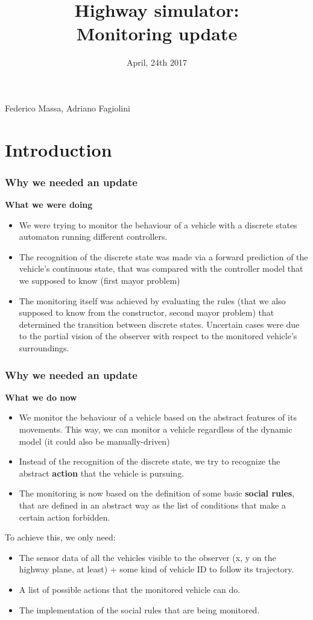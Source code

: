 \documentclass{beamer}
\title{Highway simulator: \\
Monitoring update}
\date{\small April, 24th 2017}
\begin{document}

{
\begin{frame}
\titlepage
\bigskip
\medskip
\centering\small Federico Massa, Adriano Fagiolini
\end{frame}}
\addtocounter{framenumber}{-1}

\section{Introduction}
\begin{frame}
\frametitle{Why we needed an update}
\textbf{What we were doing}
\begin{itemize}
	\item We were trying to monitor the behaviour of a vehicle
		  with a discrete states automaton running different
		  controllers.
 	\item The recognition of the discrete state was made via 
 		  a forward prediction of the vehicle's continuous state,
 		  that was compared with the controller model that we
 		  supposed to know (first mayor problem)
  	\item The monitoring itself was achieved by evaluating the
  		  rules (that we also supposed to know from the constructor, second 
  		  mayor problem) that determined the transition between
  		  discrete states. Uncertain cases were due to the 
  		  partial vision of the observer with respect to the 
  		  monitored vehicle's surroundings.
\end{itemize}
\end{frame}

\begin{frame}
\frametitle{Why we needed an update}
\textbf{What we do now}
\begin{itemize}
	\item We monitor the behaviour of a vehicle based on the
		  abstract features of its movements. This way, we can
		  monitor a vehicle regardless of the dynamic model 
		  (it could also be manually-driven)
 	\item Instead of the recognition of the discrete state,
 		  we try to recognize the abstract \textbf{action} 
 		  that the vehicle is pursuing. 
  	\item The monitoring is now based on the definition
  		  of some basic \textbf{social rules}, that 
  		  are defined in an abstract way as the list of
  		  conditions that make a certain action forbidden.
\end{itemize}

To achieve this, we only need:
\begin{itemize}
\item The sensor data of all the vehicles visible to the observer (x, y 
      on the highway plane, at least) + some kind of vehicle ID to 
      follow its trajectory.
\item A list of possible actions that the monitored vehicle can do.
\item The implementation of the social rules that are being monitored.
\end{itemize}
\end{frame}
\end{document}
